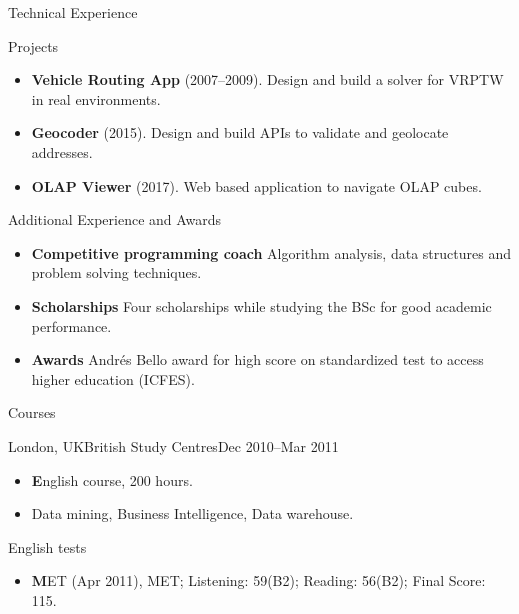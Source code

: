 \documentclass[]{mcdowellcv}
\begin{document}
	\begin{cvsection}{Technical Experience}
		\begin{cvsubsection}{Projects}{}{}
			\begin{itemize}
				\item \textbf{Vehicle Routing App} (2007--2009). Design and build a solver for VRPTW in real environments.
				\item \textbf{Geocoder} (2015). Design and build APIs to validate and geolocate addresses. 
				\item \textbf{OLAP Viewer} (2017).  Web based application to navigate OLAP cubes.

			\end{itemize}
		\end{cvsubsection}
	\end{cvsection}
	
	\newpage
	
	\begin{cvsection}{Additional Experience and Awards}
		\begin{cvsubsection}{}{}{}	
			\begin{itemize}
				\item \textbf{Competitive programming coach} Algorithm analysis, data structures and problem solving techniques.
				\item \textbf{Scholarships} Four scholarships while studying the BSc for good academic performance.
				\item \textbf{Awards} Andrés Bello award for high score on standardized test to access higher education (ICFES). 
			\end{itemize}
		\end{cvsubsection}
	\end{cvsection}

	\begin{cvsection}{Courses}
		\begin{cvsubsection}{London,	UK}{British Study Centres}{Dec 2010--Mar 2011}	
			\begin{itemize}
				\item \textbf English course, 200 hours. 
				\item Data mining, Business Intelligence, Data warehouse.
			\end{itemize}
		\end{cvsubsection}
	\end{cvsection}	
	
	\begin{cvsection}{English	tests}
		\begin{cvsubsection}{}{}{}	
			\begin{itemize}
				\item \textbf MET (Apr 2011), MET; Listening: 59(B2); Reading: 56(B2); Final	Score: 115. 
			\end{itemize}
		\end{cvsubsection}
	\end{cvsection}	

	
\end{document}
